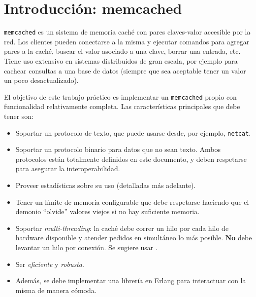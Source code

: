 \documentclass[tp]{lcc}
\newcommand{\memcached}[0]{\texttt{memcached}}
\begin{document}
\maketitle

\section{Introducción: memcached}

\memcached{}\cite{memcached} es un sistema de memoria caché con pares claves-valor accesible por la red. Los clientes pueden conectarse a la misma y ejecutar comandos para agregar pares a la caché, buscar el valor asociado a una clave, borrar una entrada, etc. Tiene uso extensivo en sistemas distribuídos de gran escala, por ejemplo para cachear consultas a una base de datos (siempre que sea aceptable tener un valor un poco desactualizado).

El objetivo de este trabajo práctico es implementar un \memcached{} propio con funcionalidad relativamente completa. Las características principales que debe tener son:
\begin{itemize}
    \item Soportar un protocolo de texto, que puede usarse desde,
        por ejemplo, \texttt{netcat}.

    \item Soportar un protocolo binario para datos que no sean texto. Ambos protocolos están totalmente definidos en este documento, y deben respetarse para asegurar la interoperabilidad.

    \item Proveer estadísticas sobre su uso (detalladas más adelante).

    \item Tener un límite de memoria configurable que debe respetarse haciendo que el demonio ``olvide'' valores viejos si no hay suficiente memoria.

    \item Soportar \emph{multi-threading}: la caché debe correr un hilo por cada hilo de hardware disponible y atender pedidos en simultáneo lo más posible. \textbf{No} debe levantar un hilo por conexión. Se sugiere usar .

    \item Ser \emph{eficiente} y \emph{robusta}.

    \item Además, se debe implementar una librería en Erlang para interactuar con la misma de manera cómoda.
\end{itemize}
\end{document}
